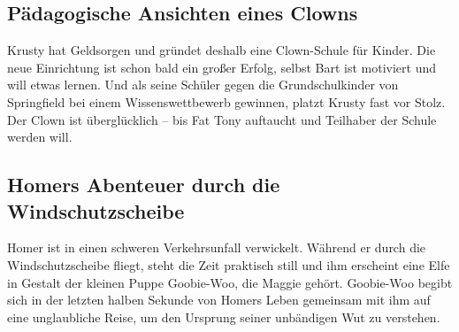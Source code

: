 
\subsection{Pädagogische Ansichten eines Clowns}\label{OABF15}
Krusty hat Geldsorgen und gründet deshalb eine Clown-Schule für Kinder. Die neue Einrichtung ist schon bald ein großer Erfolg, selbst Bart ist motiviert und will etwas lernen. Und als seine Schüler gegen die Grundschulkinder von Springfield bei einem Wissenswettbewerb gewinnen, platzt Krusty fast vor Stolz. Der Clown ist überglücklich -- bis Fat Tony auftaucht und Teilhaber der Schule werden will.


\subsection{Homers Abenteuer durch die Windschutzscheibe}\label{OABF13}
Homer ist in einen schweren Verkehrsunfall verwickelt. Während er durch die Windschutzscheibe fliegt, steht die Zeit praktisch still und ihm erscheint eine Elfe in Gestalt der kleinen Puppe Goobie-Woo, die Maggie gehört. Goobie-Woo begibt sich in der letzten halben Sekunde von Homers Leben gemeinsam mit ihm auf eine unglaubliche Reise, um den Ursprung seiner unbändigen Wut zu verstehen.

